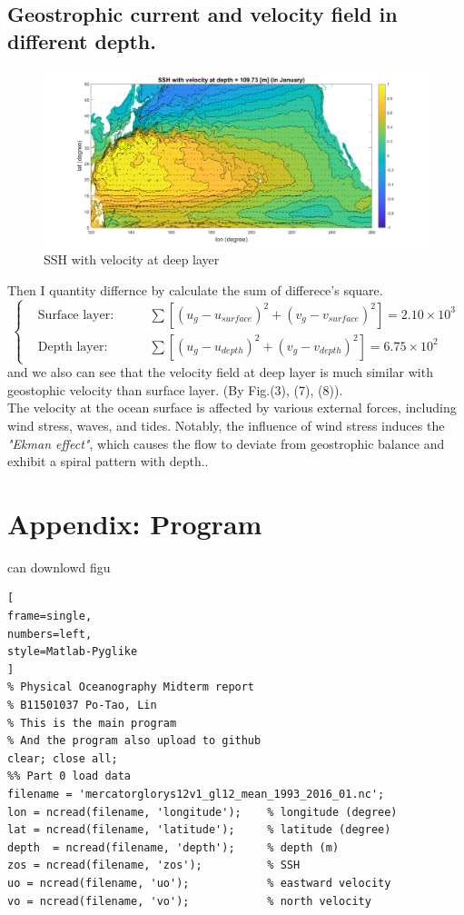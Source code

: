 \documentclass[12pt]{article}
\begin{document}
\begin{CJK*}{UTF8}{bsmi}
\subsection{Geostrophic current and velocity field in different depth.}
\begin{figure}[h]
 	\centering
	\includegraphics[width=1\textwidth]{Fig4a1.pdf}
	\caption{SSH with velocity at deep layer}
\end{figure}
Then I quantity differnce by calculate the sum of differece's square.
\begin{equation}
\left\{
\begin{aligned}
	 &\text{Surface layer}: \qquad &\sum \left[{(u_g-u_{surface})^2+(v_g-v_{surface})^2}\right] = 2.10\times 10^3\\
	 &\text{Depth layer}:\qquad &\sum \left[{(u_g-u_{depth})^2+(v_g-v_{depth})^2}\right] =6.75\times 10^2
\end{aligned}
\right.
\end{equation}
and we also can see that the velocity field at deep layer is much similar with geostophic velocity than surface layer. (By Fig.(3), (7), (8)). \\

The velocity at the ocean surface is affected by various external forces, including wind stress, waves, and tides. Notably, the influence of wind stress induces the \textit{"Ekman effect"}, which causes the flow to deviate from geostrophic balance and exhibit a spiral pattern with depth..
\newpage
\section{Appendix: Program}
can downlowd figu
\begin{lstlisting}[
frame=single,
numbers=left,
style=Matlab-Pyglike
]
% Physical Oceanography Midterm report
% B11501037 Po-Tao, Lin
% This is the main program 
% And the program also upload to github
clear; close all;
%% Part 0 load data
filename = 'mercatorglorys12v1_gl12_mean_1993_2016_01.nc';
lon = ncread(filename, 'longitude');    % longitude (degree)
lat = ncread(filename, 'latitude');     % latitude (degree)
depth  = ncread(filename, 'depth');     % depth (m)
zos = ncread(filename, 'zos');          % SSH 
uo = ncread(filename, 'uo');            % eastward velocity
vo = ncread(filename, 'vo');            % north velocity


\end{lstlisting}
\end{CJK*}
\end{document}
